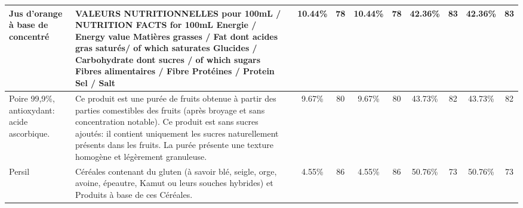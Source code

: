 \begin{tabular}{p{5cm}p{5cm}cccccccc}
                                                                                                                                                                                                                                                         Jus d'orange à base de concentré &                                                  \newline   \newline VALEURS NUTRITIONNELLES pour 100mL / NUTRITION FACTS for 100mL  \newline   \newline Energie / Energy value  \newline Matières grasses / Fat  \newline     dont acides gras saturés/ of which saturates  \newline Glucides / Carbohydrate  \newline     dont sucres / of which sugars  \newline Fibres alimentaires / Fibre  \newline Protéines / Protein  \newline Sel / Salt  &  10.44\% &   78 &  10.44\% &   78 &  42.36\% &   83 &   42.36\% &   83 \\ \hline
                                                                                                                                                                                                                                              Poire 99,9\%, antioxydant: acide ascorbique. &                                    Ce produit est une purée de fruits obtenue à partir des parties comestibles des fruits (après broyage et sans  \newline concentration notable). \newline Ce produit est sans sucres ajoutés: il contient uniquement les sucres naturellement présents dans les fruits. \newline La purée présente une texture homogène et légèrement granuleuse. &   9.67\% &   80 &   9.67\% &   80 &  43.73\% &   82 &   43.73\% &   82 \\ \hline
                                                                                                                                                                                                                                                                                   Persil &                                                                                                                                                                                                           Céréales contenant du gluten (à savoir blé, seigle, orge, avoine, épeautre, Kamut ou leurs souches hybrides) \newline et Produits à base de ces Céréales. &   4.55\% &   86 &   4.55\% &   86 &  50.76\% &   73 &   50.76\% &   73 \\ \hline
\bottomrule
\end{tabular}
